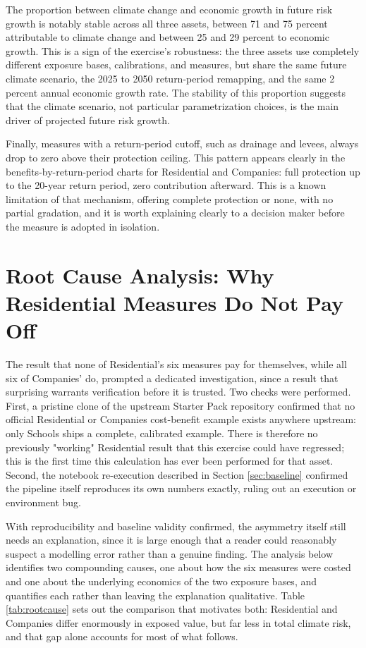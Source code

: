 \documentclass[11pt]{article}
\begin{document}
The proportion between climate change and economic growth in future risk growth is notably
stable across all three assets, between 71 and 75 percent attributable to climate change and
between 25 and 29 percent to economic growth. This is a sign of the exercise's robustness:
the three assets use completely different exposure bases, calibrations, and measures, but
share the same future climate scenario, the 2025 to 2050 return-period remapping, and the
same 2 percent annual economic growth rate. The stability of this proportion suggests that
the climate scenario, not particular parametrization choices, is the main driver of
projected future risk growth.

Finally, measures with a return-period cutoff, such as drainage and levees, always drop to
zero above their protection ceiling. This pattern appears clearly in the
benefits-by-return-period charts for Residential and Companies: full protection up to the
20-year return period, zero contribution afterward. This is a known limitation of that
mechanism, offering complete protection or none, with no partial gradation, and it is worth
explaining clearly to a decision maker before the measure is adopted in isolation.

\section{Root Cause Analysis: Why Residential Measures Do Not Pay Off}
\label{sec:root-cause}

The result that none of Residential's six measures pay for themselves, while all six of
Companies' do, prompted a dedicated investigation, since a result that surprising warrants
verification before it is trusted. Two checks were performed. First, a pristine clone of
the upstream Starter Pack repository confirmed that no official Residential or Companies
cost-benefit example exists anywhere upstream: only Schools ships a complete, calibrated
example. There is therefore no previously "working" Residential result that this exercise
could have regressed; this is the first time this calculation has ever been performed for
that asset. Second, the notebook re-execution described in Section \ref{sec:baseline} confirmed the
pipeline itself reproduces its own numbers exactly, ruling out an execution or environment
bug.

With reproducibility and baseline validity confirmed, the asymmetry itself still needs an
explanation, since it is large enough that a reader could reasonably suspect a modelling
error rather than a genuine finding. The analysis below identifies two compounding causes,
one about how the six measures were costed and one about the underlying economics of the
two exposure bases, and quantifies each rather than leaving the explanation qualitative.
Table \ref{tab:rootcause} sets out the comparison that motivates both: Residential and
Companies differ enormously in exposed value, but far less in total climate risk, and that
gap alone accounts for most of what follows.
\end{document}
